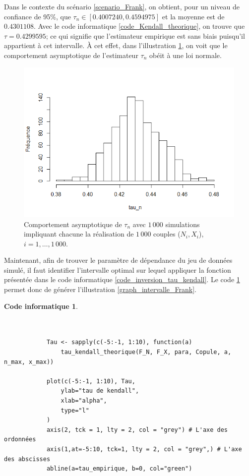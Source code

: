 \documentclass{article}
\newtheorem{code}{Code informatique}
\begin{document}
 	Dans le contexte du scénario \ref{scenario_Frank}, on obtient, pour un niveau de confiance de 95\%, que $\tau_n \in [0.4007240, 0.4594975]$ et la moyenne est de $0.4301108$. Avec le code informatique \ref{code_Kendall_theorique}, on trouve que $\tau = 0.4299595$; ce qui signifie que l'estimateur empirique est sans biais puisqu'il appartient à cet intervalle. À cet effet, dans l'illustration \ref{graph_Tau_n_asymptotique}, on voit que le comportement asymptotique de l'estimateur $\tau_n$ obéit à une loi normale.
 	
 		\begin{figure}[H]
 		\centering
 		\includegraphics[height=8cm]{Graph/Tau_n_asymptotique.png}
 		\caption{Comportement asymptotique de $\tau_n$ avec $1\,000$ simulations impliquant chacune la réalisation de $1\,000$ couples ($N_i, X_i$), $i=1,\dots, 1\,000$.} 
 		\label{graph_Tau_n_asymptotique}
 	\end{figure}
 	
 	
 	Maintenant, afin de trouver le paramètre de dépendance du jeu de données simulé, il faut identifier l'intervalle optimal sur lequel appliquer la fonction présentée dans le code informatique \ref{code_inversion_tau_kendall}. Le code \ref{code_graphique_intervalle} permet donc de générer l'illustration \ref{graph_intervalle_Frank}. \\
 	
	 \begin{minipage}[H]{\linewidth}
 	 	 	\begin{code} \label{code_graphique_intervalle}
	 		\begin{verbatim}
	 		
	 		
	 		Tau <- sapply(c(-5:-1, 1:10), function(a)
	 		    tau_kendall_theorique(F_N, F_X, para, Copule, a, n_max, x_max))
	 		
	 		plot(c(-5:-1, 1:10), Tau,
	 		    ylab="tau de kendall",
	 		    xlab="alpha",
	 		    type="l"
	 		)
	 		axis(2, tck = 1, lty = 2, col = "grey") # L'axe des ordonnées
	 		axis(1,at=-5:10, tck=1, lty = 2, col = "grey",) # L'axe des abscisses
	 		abline(a=tau_empirique, b=0, col="green")
	 		\end{verbatim}
 			\end{code}
 	\end{minipage}
\end{document}
